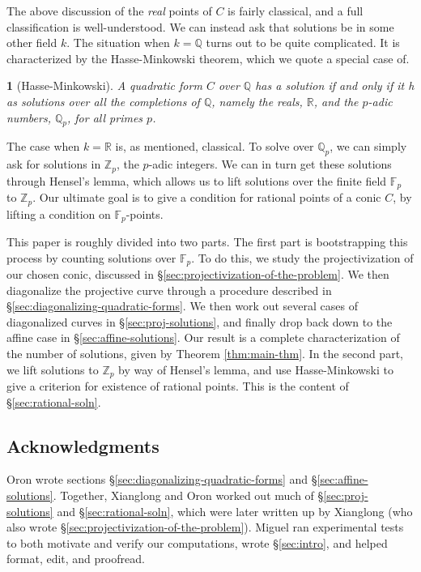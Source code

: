 \documentclass[10pt,a4paper]{amsart}
\numberwithin{equation}{section}
\numberwithin{figure}{section}
\numberwithin{table}{section}
\theoremstyle{definition}
\theoremstyle{plain}
\newtheorem{thm}{\protect\theoremname}[section]
\theoremstyle{remark}
\theoremstyle{plain}
\theoremstyle{definition}
\theoremstyle{plain}
\theoremstyle{plain}
\providecommand{\theoremname}{Theorem}
\newcommand{\F}{\mathbb{F}}
\newcommand{\Z}{\mathbb{Z}}
\newcommand{\Q}{\mathbb{Q}}
\newcommand{\R}{\mathbb{R}}
\begin{document}
	The above discussion of the \emph{real} points of $C$ is fairly classical,
	and a full classification is well-understood. We can instead ask that solutions
	be in some other field $k$.
	The situation when $k=\Q$ turns out to be quite complicated. It is
	characterized by the Hasse-Minkowski theorem, which we quote a special
	case of.
	\begin{thm}[Hasse-Minkowski]
		A quadratic form $C$ over $\Q$ has a solution if and only if it h
		as solutions
		over all the completions of $\Q$, namely the reals, $\R$, and the $p$-adic
		numbers, $\Q_p$, for all primes $p$.
	\end{thm}
	The case when $k = \R$ is, as mentioned, classical. To solve over $\Q_p$,
	we can simply ask for solutions in $\Z_p$, the $p$-adic integers. We
	can in turn get these solutions through Hensel's lemma, which allows us
	to lift solutions over the finite field $\F_p$ to $\Z_p$. Our ultimate
	goal is to give a condition for rational points of a conic $C$, by lifting
	a condition on $\F_p$-points.
	
	This paper is roughly divided into two parts. The first part
	is bootstrapping this process by counting solutions over $\F_p$. To do this,
	we study the projectivization of our chosen conic, discussed in
	\S\ref{sec:projectivization-of-the-problem}. We then diagonalize 
	the projective curve through a procedure described in 
	\S\ref{sec:diagonalizing-quadratic-forms}. We then work out several cases
	of diagonalized curves in \S\ref{sec:proj-solutions}, and finally
	drop back down to the affine case in \S\ref{sec:affine-solutions}. Our result
	is a complete characterization of the number of solutions, given by 
	Theorem \ref{thm:main-thm}.
	In the second part, we lift solutions to $\Z_p$ by way of
	Hensel's lemma, and use Hasse-Minkowski 
	to give a criterion for existence of rational points. This is the content of \S\ref{sec:rational-soln}.
	
	\subsection*{Acknowledgments} Oron wrote sections \S\ref{sec:diagonalizing-quadratic-forms} and \S\ref{sec:affine-solutions}. Together, Xianglong and Oron worked out much of \S\ref{sec:proj-solutions} and \S\ref{sec:rational-soln}, which were later written up by Xianglong (who also wrote \S\ref{sec:projectivization-of-the-problem}). Miguel ran experimental tests to both motivate and verify our computations, wrote \S\ref{sec:intro}, and helped format, edit, and proofread.
	
\end{document}

